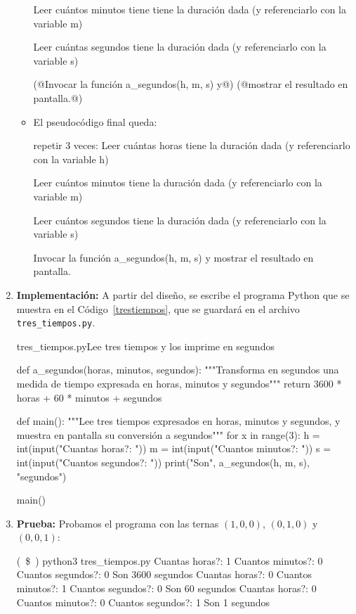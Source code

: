 \begin{enumerate}
\begin{itemize}
\begin{codigo-nohl-sn}
Leer cuántos minutos tiene tiene la duración dada
 (y referenciarlo con la variable m)

Leer cuántas segundos tiene la duración dada
 (y referenciarlo con la variable s)

(@Invocar la función a_segundos(h, m, s) y@)
(@mostrar el resultado en pantalla.@)
\end{codigo-nohl-sn}

\item El pseudocódigo final queda:

\begin{codigo-nohl-sn}
repetir 3 veces:
    Leer cuántas horas tiene la duración dada
     (y referenciarlo con la variable h)

    Leer cuántos minutos tiene la duración dada
     (y referenciarlo con la variable m)

    Leer cuántos segundos tiene la duración dada
     (y referenciarlo con la variable s)

    Invocar la función a_segundos(h, m, s) y
    mostrar el resultado en pantalla.
\end{codigo-nohl-sn}

\end{itemize}
\item {\bf Implementación:} A partir del diseño, se escribe el programa
Python que se muestra en el Código~\ref{trestiempos}, que se guardará
en el archivo \verb!tres_tiempos.py!.

\begin{codigo}{\label{trestiempos} tres\_tiempos.py}{Lee tres tiempos y los imprime en segundos}
\begin{codigo-python}
def a_segundos(horas, minutos, segundos):
    """Transforma en segundos una medida de tiempo expresada en
       horas, minutos y segundos"""
    return 3600 * horas + 60 * minutos + segundos

def main():
    """Lee tres tiempos expresados en horas, minutos y segundos,
       y muestra en pantalla su conversión a segundos"""
    for x in range(3):
        h = int(input("Cuantas horas?: "))
        m = int(input("Cuantos minutos?: "))
        s = int(input("Cuantos segundos?: "))
        print("Son", a_segundos(h, m, s), "segundos")

main()
\end{codigo-python}
\end{codigo}

\item {\bf Prueba: } Probamos el programa con las ternas $(1,0,0)$, $(0,1,0)$ y
$(0,0,1)$:

\begin{codigo-nohl-sn}
(~\$~) python3 tres_tiempos.py
Cuantas horas?: 1
Cuantos minutos?: 0
Cuantos segundos?: 0
Son 3600 segundos
Cuantas horas?: 0
Cuantos minutos?: 1
Cuantos segundos?: 0
Son 60 segundos
Cuantas horas?: 0
Cuantos minutos?: 0
Cuantos segundos?: 1
Son 1 segundos
\end{codigo-nohl-sn}
\end{enumerate}

